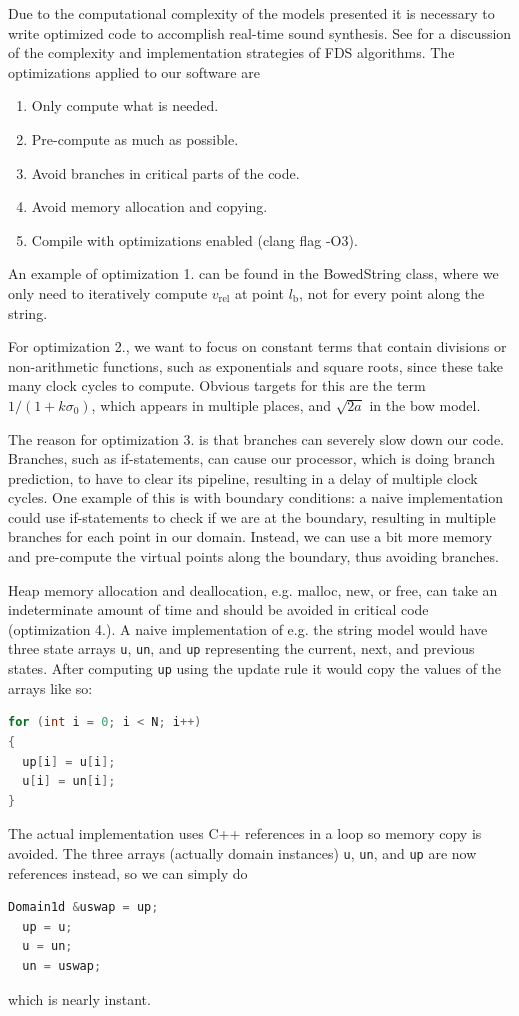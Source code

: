 \documentclass{article}
\begin{document}
Due to the computational complexity of the models presented it is necessary to write optimized code to accomplish real-time sound synthesis.
See \cite{webb_limits_2015} for a discussion of the complexity and implementation strategies of FDS algorithms.
The optimizations applied to our software are
\begin{enumerate}
  \item Only compute what is needed.
  \item Pre-compute as much as possible.
  \item Avoid branches in critical parts of the code.
  \item Avoid memory allocation and copying.
  \item Compile with optimizations enabled (clang flag -O3).
\end{enumerate}
%
An example of optimization 1. can be found in the BowedString class, where we only need to iteratively compute $v_\text{rel}$ at point $l_\text{b}$, not for every point along the string.

For optimization 2., we want to focus on constant terms that contain divisions or non-arithmetic functions, such as exponentials and square roots, since these take many clock cycles to compute.
Obvious targets for this are the term $1 / (1 + k\sigma_0)$, which appears in multiple places, and $\sqrt{2a}$ in the bow model.

The reason for optimization 3. is that branches can severely slow down our code.
Branches, such as if-statements, can cause our processor, which is doing branch prediction, to have to clear its pipeline, resulting in a delay of multiple clock cycles.
One example of this is with boundary conditions: a naive implementation could use if-statements to check if we are at the boundary, resulting in multiple branches for each point in our domain.
Instead, we can use a bit more memory and pre-compute the virtual points along the boundary, thus avoiding branches.

Heap memory allocation and deallocation, e.g. malloc, new, or free, can take an indeterminate amount of time and should be avoided in critical code (optimization 4.).
A naive implementation of e.g. the string model would have three state arrays \lstinline{u}, \lstinline{un}, and \lstinline{up} representing the current, next, and previous states. After computing \lstinline{up} using the update rule it would copy the values of the arrays like so:
\begin{lstlisting}[language=C++]
for (int i = 0; i < N; i++)
{
  up[i] = u[i];
  u[i] = un[i];
}
\end{lstlisting}
The actual implementation uses C++ references in a loop so memory copy is avoided.
The three arrays (actually domain instances) \lstinline{u}, \lstinline{un}, and \lstinline{up} are now references instead, so we can simply do
\begin{lstlisting}[language=C++]
  Domain1d &uswap = up;
  up = u;
  u = un;
  un = uswap;
\end{lstlisting}
which is nearly instant.
\end{document}
